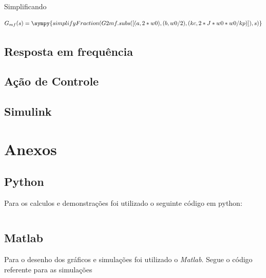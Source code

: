\documentclass[a4paper,11pt]{article}
\begin{document}
Simplificando

\begin{equation}
    G_{mf}(s) = \sympy{simplifyFraction(G2mf.subs([(a,2*w0),(b,w0/2),(kc,2*J*w0*w0/kp)]),s)}
\end{equation}

\subsection{Resposta em frequência}
\subsection{Ação de Controle}
\subsection{Simulink}
\subsection{}



\nocite{sympy}



\newpage
\section{Anexos}
\subsection{Python}

Para os calculos e demonstrações foi utilizado o seguinte código em python:

\inputminted[xleftmargin=15pt,linenos,frame=single,framesep=5pt]{python}{../python/exsim2.py}

\newpage
\subsection{Matlab}

Para o desenho dos gráficos e simulações foi utilizado o \textit{Matlab}. Segue o código referente para as simulações

\inputminted[xleftmargin=15pt,linenos,frame=single,framesep=5pt]{matlab}{../matlab/exsim2/exsim2.m}


\end{document}
